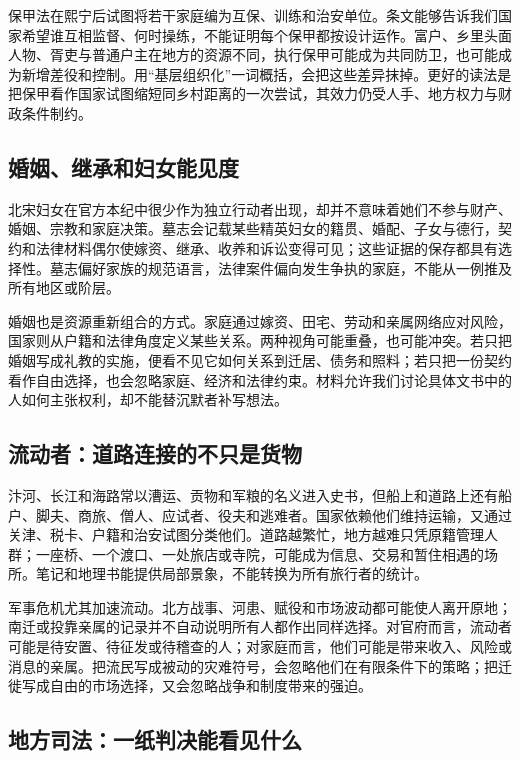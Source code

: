 保甲法在熙宁后试图将若干家庭编为互保、训练和治安单位。条文能够告诉我们国家希望谁互相监督、何时操练，不能证明每个保甲都按设计运作。富户、乡里头面人物、胥吏与普通户主在地方的资源不同，执行保甲可能成为共同防卫，也可能成为新增差役和控制。用“基层组织化”一词概括，会把这些差异抹掉。更好的读法是把保甲看作国家试图缩短同乡村距离的一次尝试，其效力仍受人手、地方权力与财政条件制约。

\subsection{婚姻、继承和妇女能见度}

北宋妇女在官方本纪中很少作为独立行动者出现，却并不意味着她们不参与财产、婚姻、宗教和家庭决策。墓志会记载某些精英妇女的籍贯、婚配、子女与德行，契约和法律材料偶尔使嫁资、继承、收养和诉讼变得可见；这些证据的保存都具有选择性。墓志偏好家族的规范语言，法律案件偏向发生争执的家庭，不能从一例推及所有地区或阶层。

婚姻也是资源重新组合的方式。家庭通过嫁资、田宅、劳动和亲属网络应对风险，国家则从户籍和法律角度定义某些关系。两种视角可能重叠，也可能冲突。若只把婚姻写成礼教的实施，便看不见它如何关系到迁居、债务和照料；若只把一份契约看作自由选择，也会忽略家庭、经济和法律约束。材料允许我们讨论具体文书中的人如何主张权利，却不能替沉默者补写想法。

\subsection{流动者：道路连接的不只是货物}

汴河、长江和海路常以漕运、贡物和军粮的名义进入史书，但船上和道路上还有船户、脚夫、商旅、僧人、应试者、役夫和逃难者。国家依赖他们维持运输，又通过关津、税卡、户籍和治安试图分类他们。道路越繁忙，地方越难只凭原籍管理人群；一座桥、一个渡口、一处旅店或寺院，可能成为信息、交易和暂住相遇的场所。笔记和地理书能提供局部景象，不能转换为所有旅行者的统计。

军事危机尤其加速流动。北方战事、河患、赋役和市场波动都可能使人离开原地；南迁或投靠亲属的记录并不自动说明所有人都作出同样选择。对官府而言，流动者可能是待安置、待征发或待稽查的人；对家庭而言，他们可能是带来收入、风险或消息的亲属。把流民写成被动的灾难符号，会忽略他们在有限条件下的策略；把迁徙写成自由的市场选择，又会忽略战争和制度带来的强迫。

\subsection{地方司法：一纸判决能看见什么}

